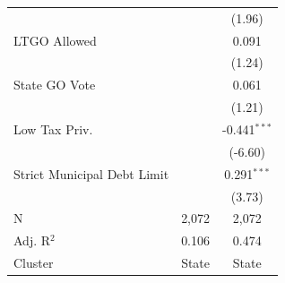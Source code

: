 \begin{tabular*}{\textwidth}{@{\extracolsep{\fill}}lcc}
                               &               & (1.96)\\   
   LTGO Allowed                &               & 0.091\\   
                               &               & (1.24)\\   
   State GO Vote               &               & 0.061\\   
                               &               & (1.21)\\   
   Low Tax Priv.               &               & -0.441$^{***}$\\   
                               &               & (-6.60)\\   
   Strict Municipal Debt Limit &               & 0.291$^{***}$\\   
                               &               & (3.73)\\   
   \hline
   N                & 2,072         & 2,072\\  
   Adj. R$^2$              & 0.106         & 0.474\\  
   Cluster              & State & State\\  
   \bottomrule
\end{tabular*}
\par\endgroup
